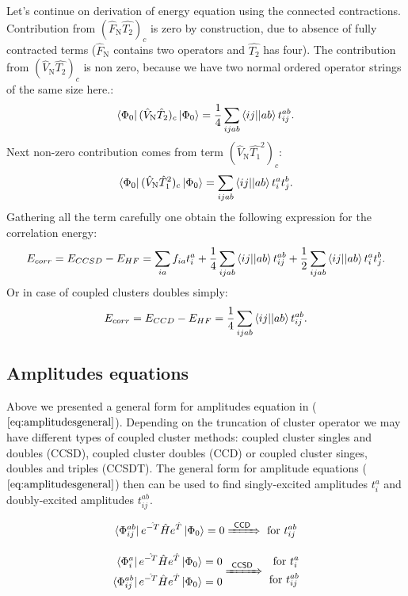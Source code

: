 \documentclass[twoside,english]{uiofysmaster}
\theoremstyle{definition}
\begin{document}
Let's continue on derivation of energy equation using the connected contractions. Contribution from $(\hat{F}_\text{N}\hat{T_2})_c$ is zero by construction, due to absence of fully contracted terms ($\hat{F}_\text{N}$ contains two operators and $\hat{T_2}$ has four). The contribution from $(\hat{V}_\text{N}\hat{T_2})_c$ is non zero, because we have two normal ordered operator strings of the same size here.:
\begin{equation}
\bra{\Phi_0}(\hat{V}_\text{N}\hat{T}_2)_c \ket{\Phi_0}=\frac{1}{4}\sum_{ijab} \braket{ij||ab}t_{ij}^{ab}.
\end{equation}
Next non-zero contribution comes from term $(\hat{V}_\text{N}\hat{T_1}^2)_c$:
\begin{equation}
\bra{\Phi_0}(\hat{V}_\text{N}\hat{T}_1^2)_c \ket{\Phi_0}=\sum_{ijab} \braket{ij||ab}t_{i}^{a}t_{j}^{b}.
\end{equation}
Gathering all the term carefully one obtain the following expression for the correlation energy:
\begin{equation}
E_{corr}= E_{CCSD} - E_{HF}= \sum_{ia} f_{ia}t_i^a + \frac{1}{4}\sum_{ijab} \braket{ij||ab}t_{ij}^{ab} +\frac{1}{2}\sum_{ijab} \braket{ij||ab}t_{i}^{a}t_{j}^{b}.
\end{equation}
Or in case of coupled clusters doubles simply:
\begin{equation}
E_{corr}= E_{CCD} - E_{HF}= \frac{1}{4}\sum_{ijab} \braket{ij||ab}t_{ij}^{ab}.
\end{equation}
\subsection{Amplitudes equations}
Above we presented a general form for amplitudes equation in ($\ref{eq:amplitudesgeneral}$). Depending on the truncation of cluster operator we may have different types of coupled cluster methods: coupled cluster singles and doubles (CCSD), coupled cluster doubles (CCD) or coupled cluster singes, doubles and triples (CCSDT). The general form for amplitude equations ($\ref{eq:amplitudesgeneral}$) then can be used to find singly-excited amplitudes $t_{i}^{a}$ and doubly-excited amplitudes  $t_{ij}^{ab}$. 


\begin{eqnarray}
\bra{\Phi_{ij}^{ab}}e^{\hat{-T}} \hat{H} e^{\hat{T}} \ket{\Phi_0}   = 0 \xRightarrow{~\textsf{CCD}~} \text{ for  $t_{ij}^{ab}$}
\end{eqnarray}

\begin{eqnarray}
\begin{aligned}
\bra{\Phi_{i}^{a}}e^{\hat{-T}} \hat{H} e^{\hat{T}} \ket{\Phi_0}   = 0  \\
\bra{\Phi_{ij}^{ab}}e^{\hat{-T}} \hat{H} e^{\hat{T}} \ket{\Phi_0}   = 0  \end{aligned}
\xRightarrow{~\textsf{CCSD}~}
\begin{aligned}
\text{ for  $t_{i}^{a}$} \\
\text{ for  $t_{ij}^{ab}$} \end{aligned}
\end{eqnarray}
\end{document}
